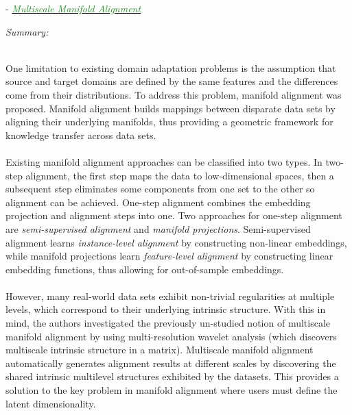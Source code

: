 \documentclass[]{article}
\newcommand{\paperentry}[4]{
            \hangindent=1cm
            \cite{#1} - \href{run:../References/#3}{\textcolor{ForestGreen}{\textit{#2}}}
            
            \noindent            
            \begin{minipage}[t]{0.1\linewidth}\hfill\end{minipage}
            \begin{minipage}[t]{0.8\linewidth}\textcolor{NavyBlue}{{\textit{Summary:}}}#4\end{minipage}
            \vspace{.25cm}
          }
\begin{document}
		\paperentry{Wang2010MultiscaleManAlignment}
		{Multiscale Manifold Alignment}
		{Manifold_Representation_Learning/Alignment/Wang2010mMultiscaleManAlignment.pdf}
		{}\\
		One limitation to existing domain adaptation problems is the assumption that source and target domains are defined by the same features and the differences come from their distributions.  To address this problem, manifold alignment was proposed.  Manifold alignment builds mappings between disparate data sets by aligning their underlying manifolds, thus providing a geometric framework for knowledge transfer across data sets.
		\\ \\
		Existing manifold alignment approaches can be classified into two types. In two-step alignment, the first step maps the data to low-dimensional spaces, then a subsequent step eliminates some components from one set to the other so alignment can be achieved.  One-step alignment combines the embedding projection and alignment steps into one.  Two approaches for one-step alignment are \textit{semi-supervised alignment} and \textit{manifold projections}. Semi-supervised alignment learns \textit{instance-level alignment} by constructing non-linear embeddings, while manifold projections learn \textit{feature-level alignment} by constructing linear embedding functions, thus allowing for out-of-sample embeddings.
		\\ \\
		However, many real-world data sets exhibit non-trivial regularities at multiple levels, which correspond to their underlying intrinsic structure.  With this in mind, the authors investigated the previously un-studied notion of multiscale manifold alignment by using multi-resolution wavelet analysis (which discovers multiscale intrinsic structure in a matrix).  Multiscale manifold alignment automatically generates alignment results at different scales by discovering the shared intrinsic multilevel structures exhibited by the datasets.  This provides a solution to the key problem in manifold alignment where users must define the latent dimensionality.  \\
		
\end{document}
